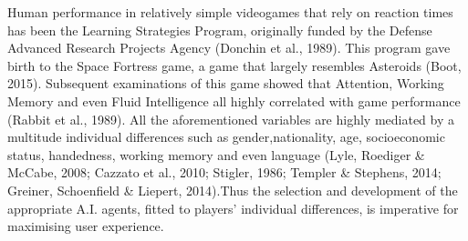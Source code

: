Human performance in relatively simple videogames that rely on reaction times has been the Learning Strategies Program, originally funded by the Defense Advanced Research Projects Agency (Donchin et al., 1989). This program gave birth to the Space Fortress game, a game that  largely resembles Asteroids (Boot, 2015). Subsequent examinations of this game showed that Attention, Working Memory and even Fluid Intelligence all highly correlated with game performance (Rabbit et al., 1989). All the aforementioned variables are highly mediated by a multitude individual differences such as gender,nationality, age, socioeconomic status, handedness, working memory and even language (Lyle, Roediger \& McCabe, 2008; Cazzato et al., 2010; Stigler, 1986; Templer \& Stephens, 2014; Greiner, Schoenfield \& Liepert, 2014).Thus the selection and development of the appropriate A.I. agents, fitted to players’ individual differences, is imperative for maximising user experience. 
